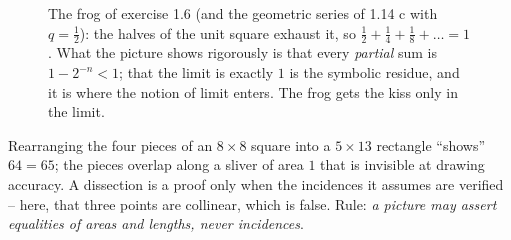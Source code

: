 \begin{figure}[H]
\centering
{}
\caption{The frog of exercise 1.6 (and the geometric series of 1.14 c with $q=\frac12$):
the halves of the unit square exhaust it, so $\frac12+\frac14+\frac18+\dots=1$. What the
picture shows rigorously is that every \emph{partial} sum is $1-2^{-n}<1$; that the limit
is exactly $1$ is the symbolic residue, and it is where the notion of limit enters. The
frog gets the kiss only in the limit.}
\label{fig:geom}
\end{figure}

\begin{trap}
Rearranging the four pieces of an $8\times8$ square into a $5\times13$ rectangle
``shows'' $64=65$; the pieces overlap along a sliver of area $1$ that is invisible at
drawing accuracy. A dissection is a proof only when the incidences it assumes are
verified -- here, that three points are collinear, which is false. Rule: \emph{a picture
may assert equalities of areas and lengths, never incidences}.
\end{trap}
